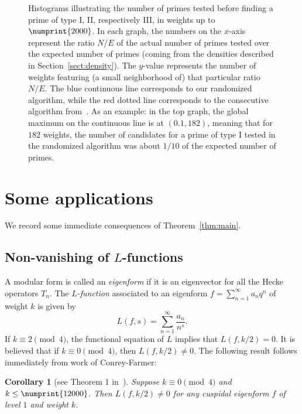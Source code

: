 \documentclass[11pt]{article}
\theoremstyle{plain}
\newtheorem{corollary}[theorem]{Corollary}
\theoremstyle{definition}
\theoremstyle{remark}
\numberwithin{equation}{section}
\newcommand{\bound}{\numprint{12000}}
\begin{document}
\begin{figure}[h]
\begin{center}
\end{center}
\caption{Histograms illustrating the number of primes tested before finding a
  prime of type I, II, respectively III, in weights up to $\numprint{2000}$.  
  In each graph, the numbers on the
$x$-axis represent the ratio $N/E$ of the actual number of primes tested over
the expected number of primes (coming from the densities described in
Section~\ref{sect:density}).  The $y$-value represents the number of weights
featuring (a small neighborhood of) that particular ratio $N/E$.  The blue 
continuous line corresponds to our randomized algorithm, while the red dotted 
line corresponds to the consecutive algorithm from~\cite{ConreyFarmer}.  
As an example: in the top graph, the global maximum on the continuous line is
at $(0.1, 182)$, meaning that for $182$ weights, the number of candidates for
a prime of type I tested in the randomized algorithm was about $1/10$ of the 
expected number of primes.}
\label{fig:histogram}
\end{figure}


\section{Some applications}
\label{sect:applications}

We record some immediate consequences of Theorem~\ref{thm:main}.

\subsection{Non-vanishing of $L$-functions}
A modular form is called an \emph{eigenform} if it is an eigenvector for all
the Hecke operators $T_n$.
The \emph{$L$-function} associated to an eigenform 
$f=\sum_{n=1}^\infty a_n q^n$ of weight $k$ is given by
\begin{equation*}
  L(f, s)=\sum_{n=1}^\infty \frac{a_n}{n^s}.
\end{equation*}
If $k\equiv 2\pmod{4}$, the functional equation of $L$ implies that
$L(f, k/2)=0$.  It is believed that if $k\equiv 0\pmod{4}$, then $L(f, k/2)\neq
0$.  The following result follows immediately from work of Conrey-Farmer: 

\begin{corollary}[see Theorem 1 in~\cite{ConreyFarmer}]
  Suppose $k\equiv 0\pmod{4}$ and $k\leq\bound$.  Then
  $L(f, k/2)\neq 0$ for any cuspidal eigenform $f$ of level $1$ and weight $k$.
\end{corollary}
\end{document}
